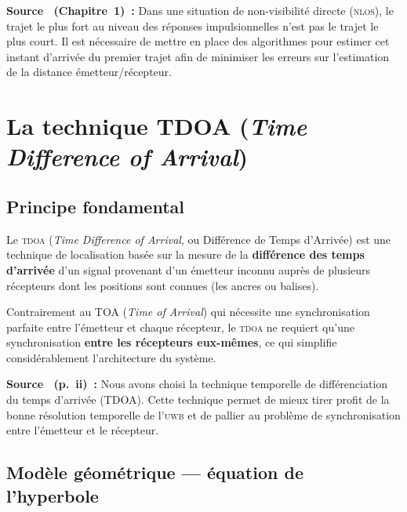 \documentclass[12pt, a4paper]{article}
\newcommand{\TDOA}{\textsc{tdoa}}
\newcommand{\UWB}{\textsc{uwb}}
\newcommand{\NLOS}{\textsc{nlos}}
\begin{document}
\begin{citebox}
\textbf{Source~\cite{Evennou2007} (Chapitre~1)~:} \og{}Dans une situation de
non-visibilité directe (\NLOS{}), le trajet le plus fort au niveau des réponses
impulsionnelles n'est pas le trajet le plus court. Il est nécessaire de mettre en
place des algorithmes pour estimer cet instant d'arrivée du premier trajet afin
de minimiser les erreurs sur l'estimation de la distance émetteur/récepteur.\fg{}
\end{citebox}

\section{La technique TDOA (\textit{Time Difference of Arrival})}

\subsection{Principe fondamental}

Le \TDOA{} (\textit{Time Difference of Arrival}, ou Différence de Temps d'Arrivée)
est une technique de localisation basée sur la mesure de la \textbf{différence des
temps d'arrivée} d'un signal provenant d'un émetteur inconnu auprès de plusieurs
récepteurs dont les positions sont connues (les \og{}ancres\fg{} ou \og{}balises\fg{}).

Contrairement au TOA (\textit{Time of Arrival}) qui nécessite une synchronisation
parfaite entre l'émetteur et chaque récepteur, le \TDOA{} ne requiert qu'une
synchronisation \textbf{entre les récepteurs eux-mêmes}, ce qui simplifie
considérablement l'architecture du système.

\begin{citebox}
\textbf{Source~\cite{Kossonou2014} (p.~ii)~:} \og{}Nous avons choisi la technique
temporelle de différenciation du temps d'arrivée (TDOA). Cette technique permet de
mieux tirer profit de la bonne résolution temporelle de l'\UWB{} et de pallier au
problème de synchronisation entre l'émetteur et le récepteur.\fg{}
\end{citebox}

\subsection{Modèle géométrique — équation de l'hyperbole}
\end{document}
